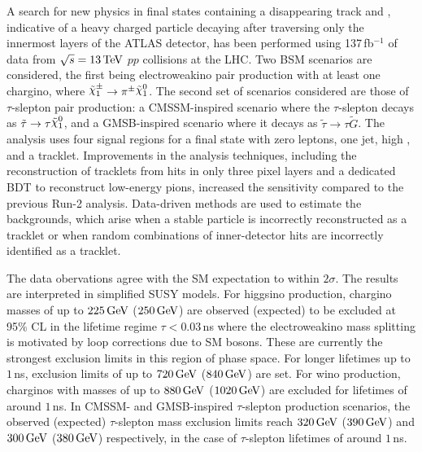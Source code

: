 A search for new physics in final states containing a disappearing track and \met, indicative of a heavy charged particle decaying after traversing only the innermost layers of the ATLAS detector, has been performed using 137\,fb$^{-1}$ of data from $\sqrt{s} = 13\,\text{TeV}$ $pp$ collisions at the LHC. Two BSM scenarios are considered, the first being electroweakino pair production with at least one chargino, where $\chinoonepm \rightarrow  \pi^{\pm}\ninoone$. The second set of scenarios considered are those of $\tau$-slepton pair production: a CMSSM-inspired scenario where the $\tau$-slepton decays as $\tilde{\tau} \rightarrow \tau \ninoone$, and a GMSB-inspired scenario where it decays as $\tilde{\tau} \rightarrow \tau \tilde{G}$. The analysis uses four signal regions for a final state with zero leptons, one jet, high \met, and a tracklet. Improvements in the analysis techniques, including the reconstruction of tracklets from hits in only three pixel layers and a dedicated BDT to reconstruct low-energy pions, increased the sensitivity compared to the previous Run-2 analysis. Data-driven methods are used to estimate the backgrounds, which arise when a stable particle is incorrectly reconstructed as a tracklet or when random combinations of inner-detector hits are incorrectly identified as a tracklet.

The data obervations agree with the SM expectation to within $2\sigma$. The results are interpreted in simplified SUSY models. For higgsino production, chargino masses of up to $225\,\text{GeV}$ ($250\,\text{GeV}$) are observed (expected) to be excluded at 95\% CL in the lifetime regime $\tau < 0.03$\,ns where the electroweakino mass splitting is motivated by loop corrections due to SM bosons. These are currently the strongest exclusion limits in this region of phase space. For longer lifetimes up to $1$\,ns, exclusion limits of up to $720\,\text{GeV}$ ($840\,\text{GeV}$) are set. For wino production, charginos with masses of up to $880\,\text{GeV}$ ($1020\,\text{GeV}$) are excluded for lifetimes of around $1\,$ns. In CMSSM- and GMSB-inspired $\tau$-slepton production scenarios, the observed (expected) $\tau$-slepton mass exclusion limits reach $320\,\text{GeV}$ ($390\,\text{GeV}$) and $300\,\text{GeV}$ ($380\,\text{GeV}$) respectively, in the case of $\tau$-slepton lifetimes of around $1\,$ns. 

